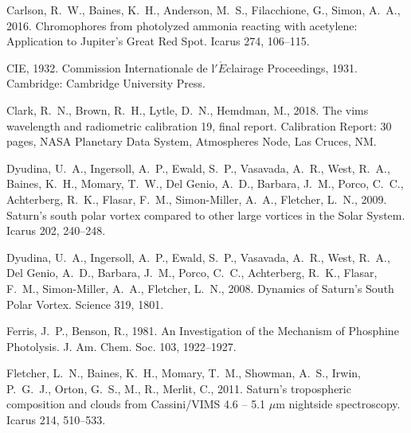 \documentclass[article,11pt]{emulateapj}
\begin{document}
\begin{thebibliography}{85}
{Carlson}, R.~W., {Baines}, K.~H., {Anderson}, M.~S., {Filacchione}, G.,
  {Simon}, A.~A., 2016. {Chromophores from photolyzed ammonia reacting with
  acetylene: Application to Jupiter's Great Red Spot}. Icarus 274, 106--115.

{CIE}, 1932. {Commission Internationale de l$'$$\acute{E}$clairage Proceedings,
  1931.} Cambridge: Cambridge University Press.

{Clark}, R.~N., {Brown}, R.~H., {Lytle}, D.~N., {Hemdman}, M., 2018. The vims
  wavelength and radiometric calibration 19, final report. Calibration Report:
  30 pages, NASA Planetary Data System, Atmospheres Node, Las Cruces, NM.

{Dyudina}, U.~A., {Ingersoll}, A.~P., {Ewald}, S.~P., {Vasavada}, A.~R.,
  {West}, R.~A., {Baines}, K.~H., {Momary}, T.~W., {Del Genio}, A.~D.,
  {Barbara}, J.~M., {Porco}, C.~C., {Achterberg}, R.~K., {Flasar}, F.~M.,
  {Simon-Miller}, A.~A., {Fletcher}, L.~N., 2009. {Saturn's south polar vortex
  compared to other large vortices in the Solar System}. Icarus 202, 240--248.

{Dyudina}, U.~A., {Ingersoll}, A.~P., {Ewald}, S.~P., {Vasavada}, A.~R.,
  {West}, R.~A., {Del Genio}, A.~D., {Barbara}, J.~M., {Porco}, C.~C.,
  {Achterberg}, R.~K., {Flasar}, F.~M., {Simon-Miller}, A.~A., {Fletcher},
  L.~N., 2008. {Dynamics of Saturn's South Polar Vortex}. Science 319, 1801.

{Ferris}, J.~P., {Benson}, R., 1981. {An Investigation of the Mechanism of
  Phosphine Photolysis}. J. Am. Chem. Soc. 103, 1922--1927.

{Fletcher}, L.~N., {Baines}, K.~H., {Momary}, T.~M., {Showman}, A.~S., {Irwin},
  P.~G.~J., {Orton}, G.~S., M., R., {Merlit}, C., 2011{}. {Saturn's
  tropospheric composition and clouds from Cassini/VIMS 4.6 -- 5.1 $\mu$m
  nightside spectroscopy}. Icarus 214, 510--533.


\end{thebibliography}
\end{document}
